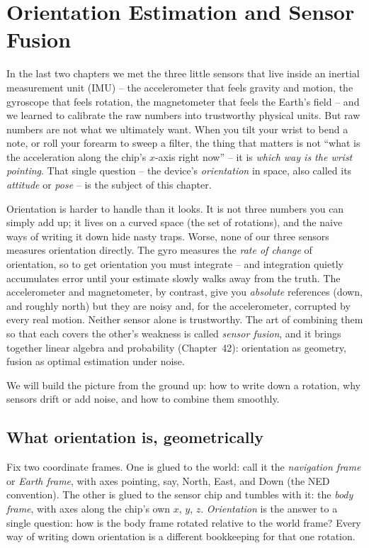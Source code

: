 \chapter{Orientation Estimation and Sensor Fusion}

In the last two chapters we met the three little sensors that live inside an inertial
measurement unit (IMU) -- the accelerometer that feels gravity and motion, the
gyroscope that feels rotation, the magnetometer that feels the Earth's field -- and we
learned to calibrate the raw numbers into trustworthy physical units. But raw numbers are
not what we ultimately want. When you tilt your wrist to bend a note, or roll your
forearm to sweep a filter, the thing that matters is not ``what is the acceleration
along the chip's $x$-axis right now'' -- it is \emph{which way is the wrist pointing}.
That single question -- the device's \emph{orientation} in space, also called its
\emph{attitude} or \emph{pose} -- is the subject of this chapter.

Orientation is harder to handle than it looks. It is not three numbers you can simply add
up; it lives on a curved space (the set of rotations), and the naive ways of writing
it down hide nasty traps. Worse, none of our three sensors measures orientation
directly. The gyro measures the \emph{rate of change} of orientation, so to get
orientation you must integrate -- and integration quietly accumulates error until your
estimate slowly walks away from the truth. The accelerometer and magnetometer, by
contrast, give you \emph{absolute} references (down, and roughly north) but they are
noisy and, for the accelerometer, corrupted by every real motion. Neither sensor alone
is trustworthy. The art of combining them so that each covers the other's weakness is
called \emph{sensor fusion}, and it brings together
linear algebra and probability (Chapter~42): orientation as geometry,
fusion as optimal estimation under noise.

We will build the picture from the ground up: how to write down a rotation, why sensors drift or add noise, and how to combine them smoothly.

\section{What orientation is, geometrically}
\label{ch36:what-orientation-is}

Fix two coordinate frames. One is glued to the world: call it the \emph{navigation
frame} or \emph{Earth frame}, with axes pointing, say, North, East, and Down (the NED
convention). The other is glued to the sensor chip and tumbles with it: the \emph{body
frame}, with axes along the chip's own $x$, $y$, $z$. \emph{Orientation} is the answer
to a single question: how is the body frame rotated relative to the world frame? Every
way of writing down orientation is a different bookkeeping for that one rotation.

